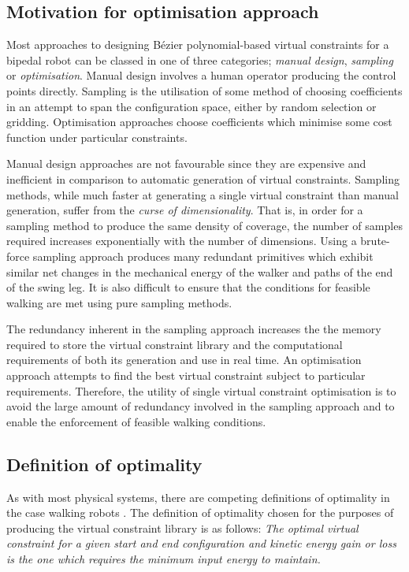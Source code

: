 \subsection{Motivation for optimisation approach}
Most approaches to designing Bézier polynomial-based virtual constraints for a bipedal robot can be classed in one of three categories; \textit{manual design}, \textit{sampling} or \textit{optimisation}. Manual design involves a human operator producing the control points directly. Sampling is the utilisation of some method of choosing coefficients in an attempt to span the configuration space, either by random selection or gridding. Optimisation approaches choose coefficients which minimise some cost function under particular constraints.

Manual design approaches are not favourable since they are expensive and inefficient in comparison to automatic generation of virtual constraints. Sampling methods, while much faster at generating a single virtual constraint than manual generation, suffer from the \textit{curse of dimensionality}. That is, in order for a sampling method to produce the same density of coverage, the number of samples required increases exponentially with the number of dimensions. Using a brute-force sampling approach produces many redundant primitives which exhibit similar net changes in the mechanical energy of the walker and paths of the end of the swing leg. It is also difficult to ensure that the conditions for feasible walking are met using pure sampling methods.

The redundancy inherent in the sampling approach increases the the memory required to store the virtual constraint library and the computational requirements of both its generation and use in real time. An optimisation approach attempts to find the best virtual constraint subject to particular requirements. Therefore, the utility of single virtual constraint optimisation is to avoid the large amount of redundancy involved in the sampling approach and to enable the enforcement of feasible walking conditions.

\subsection{Definition of optimality}
As with most physical systems, there are competing definitions of optimality in the case walking robots \cite{sreenath2011compliant, westervelt2003hybrid, hurmuzlu2004modeling}. The definition of optimality chosen for the purposes of producing the virtual constraint library is as follows:
\emph{The optimal virtual constraint for a given start and end configuration and kinetic energy gain or loss is the one which requires the minimum input energy to maintain.}

